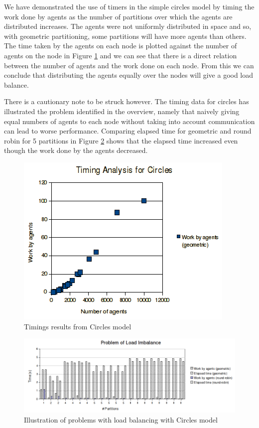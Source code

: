 We have demonstrated the use of timers in the simple circles model by timing the work done by agents as the number of partitions over which the agents are distributed increases. The agents were not uniformly distributed in space and so, with geometric partitioning, some partitions will have more agents than others. The time taken by the agents on each node is plotted against the number of agents on the node in Figure \ref{fig:circle_timings} and we can see that there is a direct relation between the number of agents and the work done on each node. From this we can conclude that distributing the agents equally over the nodes will give a good load balance.

There is a cautionary note to be struck however. The timing data for circles has illustrated the problem identified in the overview, namely that naively giving equal numbers of agents to each node without taking into account communication can lead to worse performance. Comparing elapsed time for geometric and round robin for 5 partitions in Figure \ref{fig:timings_problems} shows that the elapsed time increased even though the work done by the agents decreased.

\begin{figure}[h]
 \centering
  \includegraphics[scale=0.75]{circles-timings.png}
 \caption{Timings results from Circles model}
 \label{fig:circle_timings}
\end{figure}

\begin{figure}[h]
  \hspace{-10mm}
  \includegraphics[scale=0.6]{timings-problems.png}
 \caption{Illustration of problems with load balancing with Circles model}
 \label{fig:timings_problems}
\end{figure}

